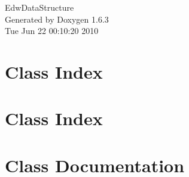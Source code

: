 \documentclass[a4paper]{book}
\begin{document}
\hypersetup{pageanchor=false}
\begin{titlepage}
\vspace*{7cm}
\begin{center}
{\Large EdwDataStructure }\\
\vspace*{1cm}
{\large Generated by Doxygen 1.6.3}\\
\vspace*{0.5cm}
{\small Tue Jun 22 00:10:20 2010}\\
\end{center}
\end{titlepage}
\clearemptydoublepage
{}
\tableofcontents
\clearemptydoublepage
{}
\hypersetup{pageanchor=true}
\chapter{Class Index}

\chapter{Class Index}

\chapter{Class Documentation}






























\printindex
\end{document}
